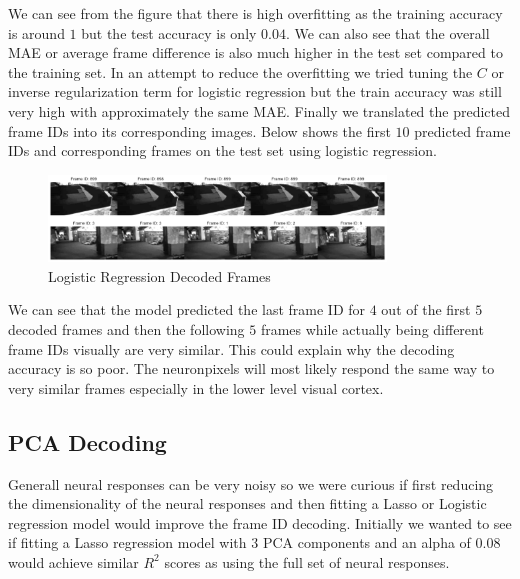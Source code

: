 \documentclass[12pt, letterpaper]{article}
\begin{document}
We can see from the figure that there is high overfitting as the training accuracy is around $1$ but the test accuracy is only $0.04$. We can also see that the overall MAE or average frame difference is also much higher in the test set compared to the training set. In an attempt to reduce the overfitting we tried tuning the $C$ or inverse regularization term for logistic regression but the train accuracy was still very high with approximately the same MAE. Finally we translated the predicted frame IDs into its corresponding images. Below shows the first $10$ predicted frame IDs and corresponding frames on the test set using logistic regression.

\begin{figure}[H]
    \centering
    \includegraphics[width=0.8\textwidth]{neuropixel_logistic_reg_video.png}
    \caption{Logistic Regression Decoded Frames}
    \label{fig:neuropixel_logistic_frame_id_decoded}
\end{figure}

We can see that the model predicted the last frame ID for $4$ out of the first $5$ decoded frames and then the following $5$ frames while actually being different frame IDs visually are very similar. This could explain why the decoding accuracy is so poor. The neuronpixels will most likely respond the same way to very similar frames especially in the lower level visual cortex.

\subsection{PCA Decoding}
\label{subsec:pca_decoding}
Generall neural responses can be very noisy so we were curious if first reducing the dimensionality of the neural responses and then fitting a Lasso or Logistic regression model would improve the frame ID decoding. Initially we wanted to see if fitting a Lasso regression model with $3$ PCA components and an alpha of $0.08$ would achieve similar $R^2$ scores as using the full set of neural responses.
\end{document}
